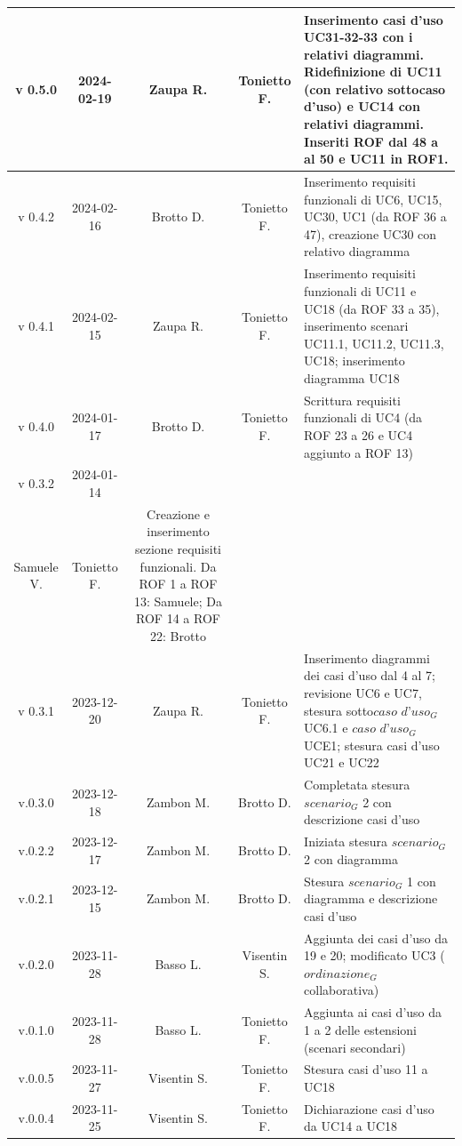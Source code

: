 \documentclass[12pt, oneside]{article}
\begin{document}
\begin{longtable}{|c|c|c|c|p{7cm}|}
\hline
v 0.5.0 & 2024-02-19 & Zaupa R. & Tonietto F. & Inserimento casi d'uso UC31-32-33 con i relativi diagrammi. Ridefinizione di UC11 (con relativo sottocaso d'uso) e UC14 con relativi diagrammi. Inseriti ROF dal 48 a al 50 e UC11 in ROF1. \\
\hline
v 0.4.2 & 2024-02-16 & Brotto D. & Tonietto F. & Inserimento requisiti funzionali di UC6, UC15, UC30, UC1 (da ROF 36 a 47), creazione UC30 con relativo diagramma \\
\hline
v 0.4.1 & 2024-02-15 & Zaupa R. & Tonietto F. & Inserimento requisiti funzionali di UC11 e UC18 (da ROF 33 a 35), inserimento scenari UC11.1, UC11.2, UC11.3, UC18; inserimento diagramma UC18 \\
\hline
v 0.4.0 & 2024-01-17 & Brotto D. & Tonietto F. & Scrittura requisiti funzionali di UC4 (da ROF 23 a 26 e UC4 aggiunto a ROF 13) \\
\hline
v 0.3.2 & 2024-01-14 & 
\begin{tabular}[c]{@{}c@{}}
    Davide B. \\
    Samuele V.
  \end{tabular} 
& Tonietto F. & Creazione e inserimento sezione requisiti funzionali. Da ROF 1 a ROF 13: Samuele; Da ROF 14 a ROF 22: Brotto\\
\hline
v 0.3.1 & 2023-12-20 & Zaupa R. & Tonietto F. & Inserimento diagrammi dei casi d'uso dal 4 al 7; revisione  UC6 e UC7, stesura sotto$\textit{caso d'uso}_G$ UC6.1 e $\textit{caso d'uso}_G$ UCE1; stesura casi d'uso UC21 e UC22 \\
\hline
v.0.3.0 & 2023-12-18 & Zambon M. & Brotto D. & Completata stesura $\textit{scenario}_G$ 2 con descrizione casi d'uso \\
\hline
v.0.2.2 & 2023-12-17 & Zambon M. & Brotto D. & Iniziata stesura $\textit{scenario}_G$ 2 con diagramma \\
\hline
v.0.2.1 & 2023-12-15 & Zambon M. & Brotto D. & Stesura $\textit{scenario}_G$ 1 con diagramma e descrizione casi d'uso \\
\hline
v.0.2.0 & 2023-11-28 & Basso L. & Visentin S. & Aggiunta dei casi d'uso da 19 e 20; modificato UC3 ($\textit{ordinazione}_G$ collaborativa) \\
\hline
v.0.1.0 & 2023-11-28 & Basso L. & Tonietto F. & Aggiunta ai casi d'uso da 1 a 2 delle estensioni (scenari secondari) \\
\hline
v.0.0.5 & 2023-11-27 & Visentin S. & Tonietto F. & Stesura casi d'uso 11 a UC18 \\
\hline
v.0.0.4 & 2023-11-25 & Visentin S. & Tonietto F. & Dichiarazione casi d'uso da UC14 a UC18 \\

\end{longtable}
\end{document}
